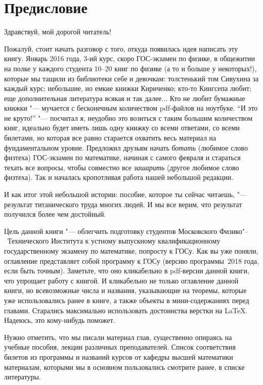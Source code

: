 \chapter*{Предисловие}

\begin{center} 
Здравствуй, мой дорогой читатель!
\end{center}

Пожалуй, стоит начать разговор с того, откуда появилась идея написать эту книгу. Январь 2016 года, 3-ий курс, скоро ГОС-экзамен по физике, в общежитии на полке у каждого студента 10--20 книг по физике (а то и больше у некоторых!), которые мы тащили из библиотеки себе и девочкам: толстенький том Сивухина за каждый курс; небольшие, но емкие книжки Кириченко; кто-то Кингсепа любит; еще дополнительная литература всякая и так далее... Кто не любит бумажные книжки "--- мучается с бесконечным количеством pdf-файлов на ноутбуке. ``И это не круто!'' "--- посчитал я, неудобно это возиться с таким большим количеством книг, идеально будет иметь лишь одну книжку со всеми ответами, со всеми билетами, но которая все равно старается охватить весь материал на фундаментальном уровне. Предложил друзьям начать \textit{ботать} (любимое слово физтеха) ГОС-экзамен по математике, начиная с самого февраля и стараться техать все вопросы, чтобы совместно все \textit{зашарить} (другое любимое слово физтеха). Так и началась кропотливая работа нашей небольшой редакции.


И как итог этой небольшой истории: пособие, которое ты сейчас читаешь, "--- результат титанического труда многих людей. И мы все верим, что результат получился более чем достойный. 

Цель данной книги "--- облегчить подготовку студентов Московского Физико"--~Технического Института к устному выпускному квалификационному государственному экзамену по математике, попросту к ГОСу. Как вы уже поняли, оглавление представляет собой программу к ГОСу (версию программы~2018 года, если быть точным). Заметьте, что оно кликабельно в pdf-версии данной книги, что упрощает работу с книгой. И кликабельно не только оглавление данной книги, но всевозможные числа и названия, указывающие на теоремы, которые уже использовались ранее в книге, а также объекты в мини-содержаниях перед главами. Старались максимально использовать достоинства верстки на \LaTeX. Надеюсь, это кому-нибудь поможет. 

Нужно отметить, что мы писали материал глав, существенно опираясь на учебные пособия, лекции различных преподавателей. Список соответствия билетов из программы и названий курсов от кафедры высшей математики материалам, которыми мы в основном пользовались смотрите ранее, в списке литературы.

